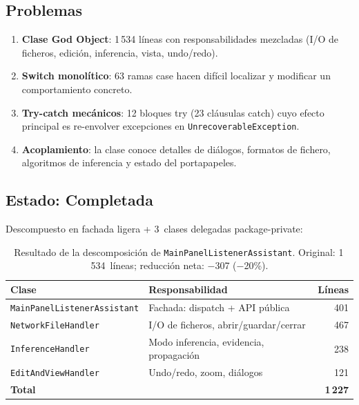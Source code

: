 \documentclass[12pt,a4paper]{article}
\newcommand{\clase}[1]{\texttt{#1}}
\newcommand{\bad}[1]{\textcolor{codered}{\textbf{#1}}}
\newcommand{\warn}[1]{\textcolor{warnorange}{\textbf{#1}}}
\begin{document}
\subsection{Problemas}

\begin{enumerate}
  \item \bad{Clase God Object}: 1\,534 líneas con responsabilidades
        mezcladas (I/O de ficheros, edición, inferencia, vista, undo/redo).
  \item \bad{Switch monolítico}: 63 ramas case hacen difícil localizar
        y modificar un comportamiento concreto.
  \item \warn{Try-catch mecánicos}: 12 bloques try (23 cláusulas catch)
        cuyo efecto principal es re-envolver excepciones en
        \clase{UnrecoverableException}.
  \item \warn{Acoplamiento}: la clase conoce detalles de diálogos,
        formatos de fichero, algoritmos de inferencia y estado del
        portapapeles.
\end{enumerate}

\subsection{Estado: Completada}

Descompuesto en fachada ligera + 3~clases delegadas package-private:

\begin{table}[H]
\centering
\small
\begin{tabular}{llr}
\toprule
\textbf{Clase} & \textbf{Responsabilidad} & \textbf{Líneas} \\
\midrule
\clase{MainPanelListenerAssistant} & Fachada: dispatch + API pública & 401 \\
\clase{NetworkFileHandler}         & I/O de ficheros, abrir/guardar/cerrar & 467 \\
\clase{InferenceHandler}           & Modo inferencia, evidencia, propagación & 238 \\
\clase{EditAndViewHandler}         & Undo/redo, zoom, diálogos & 121 \\
\midrule
\textbf{Total}                     & & \textbf{1\,227} \\
\bottomrule
\end{tabular}
\caption{Resultado de la descomposición de \clase{MainPanelListenerAssistant}.
         Original: 1\,534~líneas; reducción neta: $-$307 ($-$20\%).}
\label{tab:r1-delegados}
\end{table}
\end{document}
